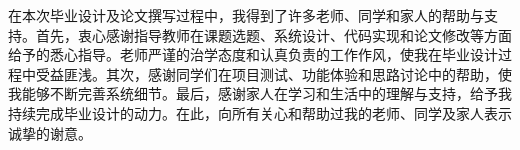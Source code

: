 
\begin{acknowledgements}
在本次毕业设计及论文撰写过程中，我得到了许多老师、同学和家人的帮助与支持。首先，衷心感谢指导教师在课题选题、系统设计、代码实现和论文修改等方面给予的悉心指导。老师严谨的治学态度和认真负责的工作作风，使我在毕业设计过程中受益匪浅。其次，感谢同学们在项目测试、功能体验和思路讨论中的帮助，使我能够不断完善系统细节。最后，感谢家人在学习和生活中的理解与支持，给予我持续完成毕业设计的动力。在此，向所有关心和帮助过我的老师、同学及家人表示诚挚的谢意。
\end{acknowledgements}